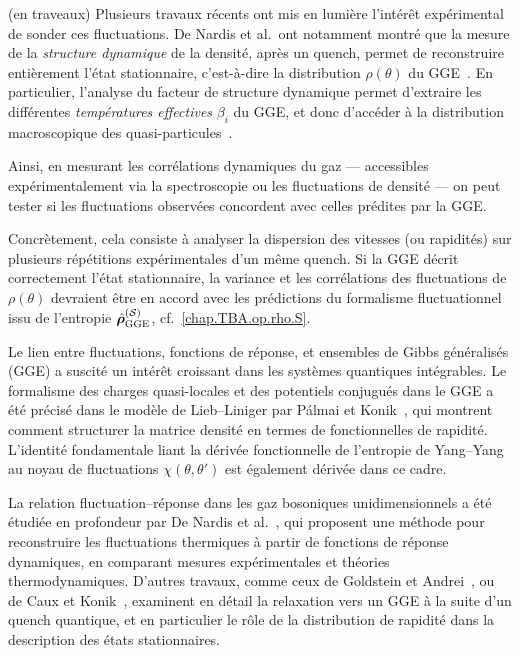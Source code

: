 {\color{blue} { \color{red} (en traveaux)} 
\medskip
Plusieurs travaux récents ont mis en lumière l’intérêt expérimental de sonder ces fluctuations. De Nardis et al.\ ont notamment montré que la mesure de la \textit{structure dynamique} de la densité, après un quench, permet de reconstruire entièrement l’état stationnaire, c’est-à-dire la distribution \( \rho(\theta) \) du GGE~\cite{DeNardis2017}. En particulier, l’analyse du facteur de structure dynamique permet d’extraire les différentes \textit{températures effectives} \( \beta_i \) du GGE, et donc d’accéder à la distribution macroscopique des quasi-particules~\cite{Goldstein2013,CauxKonik2012}.

\medskip
Ainsi, en mesurant les corrélations dynamiques du gaz — accessibles expérimentalement via la spectroscopie ou les fluctuations de densité — on peut tester si les fluctuations observées concordent avec celles prédites par la GGE.

\medskip
Concrètement, cela consiste à analyser la dispersion des vitesses (ou rapidités) sur plusieurs répétitions expérimentales d’un même quench. Si la GGE décrit correctement l’état stationnaire, la variance et les corrélations des fluctuations de \( \rho(\theta) \) devraient être en accord avec les prédictions du formalisme fluctuationnel issu de l’entropie \( \hat{\bm{\rho}}^{(\mathcal{S})}_{\mathrm{GGE}} \), cf.~\eqref{chap.TBA.op.rho.S}.

\medskip
Le lien entre fluctuations, fonctions de réponse, et ensembles de Gibbs généralisés (GGE) a suscité un intérêt croissant dans les systèmes quantiques intégrables. Le formalisme des charges quasi-locales et des potentiels conjugués dans le GGE a été précisé dans le modèle de Lieb–Liniger par Pálmai et Konik~\cite{Palmai2018}, qui montrent comment structurer la matrice densité en termes de fonctionnelles de rapidité. L'identité fondamentale liant la dérivée fonctionnelle de l'entropie de Yang–Yang au noyau de fluctuations $\chi(\theta,\theta')$ est également dérivée dans ce cadre.

La relation fluctuation–réponse dans les gaz bosoniques unidimensionnels a été étudiée en profondeur par De Nardis et al.~\cite{DeNardis2017}, qui proposent une méthode pour reconstruire les fluctuations thermiques à partir de fonctions de réponse dynamiques, en comparant mesures expérimentales et théories thermodynamiques. D'autres travaux, comme ceux de Goldstein et Andrei~\cite{Goldstein2013}, ou de Caux et Konik~\cite{CauxKonik2012}, examinent en détail la relaxation vers un GGE à la suite d’un quench quantique, et en particulier le rôle de la distribution de rapidité dans la description des états stationnaires.

}
